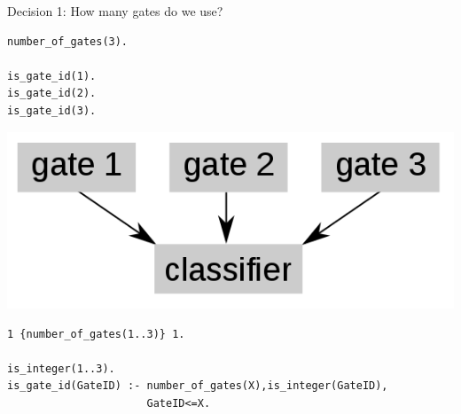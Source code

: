 \documentclass[10pt,dvipsnames]{beamer}
\begin{document}
\begin{frame}[fragile]{Decision 1: How many gates do we use?}

\small
\begin{minipage}{0.45\textwidth}
\color{my_example_color}
\begin{verbatim}
number_of_gates(3).

is_gate_id(1).
is_gate_id(2).
is_gate_id(3).
\end{verbatim}

\end{minipage}
\hfill
\begin{minipage}{0.45\textwidth}
\begin{center}
\includegraphics[scale=0.3]{exp1.png}
\end{center}
\end{minipage}
\vspace{1.3cm}

\begin{verbatim}
1 {number_of_gates(1..3)} 1.

is_integer(1..3).
is_gate_id(GateID) :- number_of_gates(X),is_integer(GateID), 
                      GateID<=X.
\end{verbatim}
\end{frame}
\end{document}
